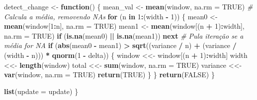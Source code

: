 \documentclass[
]{article}
\newenvironment{Shaded}{\begin{snugshade}}{\end{snugshade}}
\newcommand{\AttributeTok}[1]{\textcolor[rgb]{0.13,0.29,0.53}{#1}}
\newcommand{\CommentTok}[1]{\textcolor[rgb]{0.56,0.35,0.01}{\textit{#1}}}
\newcommand{\ConstantTok}[1]{\textcolor[rgb]{0.56,0.35,0.01}{#1}}
\newcommand{\ControlFlowTok}[1]{\textcolor[rgb]{0.13,0.29,0.53}{\textbf{#1}}}
\newcommand{\DecValTok}[1]{\textcolor[rgb]{0.00,0.00,0.81}{#1}}
\newcommand{\FunctionTok}[1]{\textcolor[rgb]{0.13,0.29,0.53}{\textbf{#1}}}
\newcommand{\NormalTok}[1]{#1}
\newcommand{\OtherTok}[1]{\textcolor[rgb]{0.56,0.35,0.01}{#1}}
\newcommand{\SpecialCharTok}[1]{\textcolor[rgb]{0.81,0.36,0.00}{\textbf{#1}}}
\begin{document}
\begin{Shaded}
\begin{Highlighting}[]
\NormalTok{  detect\_change }\OtherTok{\textless{}{-}} \ControlFlowTok{function}\NormalTok{() \{}
\NormalTok{    mean\_val }\OtherTok{\textless{}{-}} \FunctionTok{mean}\NormalTok{(window, }\AttributeTok{na.rm =} \ConstantTok{TRUE}\NormalTok{) }\CommentTok{\# Calcula a média, removendo NAs}
    \ControlFlowTok{for}\NormalTok{ (n }\ControlFlowTok{in} \DecValTok{1}\SpecialCharTok{:}\NormalTok{(width }\SpecialCharTok{{-}} \DecValTok{1}\NormalTok{)) \{}
\NormalTok{      mean0 }\OtherTok{\textless{}{-}} \FunctionTok{mean}\NormalTok{(window[}\DecValTok{1}\SpecialCharTok{:}\NormalTok{n], }\AttributeTok{na.rm =} \ConstantTok{TRUE}\NormalTok{)}
\NormalTok{      mean1 }\OtherTok{\textless{}{-}} \FunctionTok{mean}\NormalTok{(window[(n }\SpecialCharTok{+} \DecValTok{1}\NormalTok{)}\SpecialCharTok{:}\NormalTok{width], }\AttributeTok{na.rm =} \ConstantTok{TRUE}\NormalTok{)}
      \ControlFlowTok{if}\NormalTok{ (}\FunctionTok{is.na}\NormalTok{(mean0) }\SpecialCharTok{||} \FunctionTok{is.na}\NormalTok{(mean1)) }\ControlFlowTok{next} \CommentTok{\# Pula iteração se a média for NA}
      \ControlFlowTok{if}\NormalTok{ (}\FunctionTok{abs}\NormalTok{(mean0 }\SpecialCharTok{{-}}\NormalTok{ mean1) }\SpecialCharTok{\textgreater{}} \FunctionTok{sqrt}\NormalTok{((variance }\SpecialCharTok{/}\NormalTok{ n) }\SpecialCharTok{+}\NormalTok{ (variance }\SpecialCharTok{/}\NormalTok{ (width }\SpecialCharTok{{-}}\NormalTok{ n))) }\SpecialCharTok{*} \FunctionTok{qnorm}\NormalTok{(}\DecValTok{1} \SpecialCharTok{{-}}\NormalTok{ delta)) \{}
\NormalTok{        window }\OtherTok{\textless{}\textless{}{-}}\NormalTok{ window[(n }\SpecialCharTok{+} \DecValTok{1}\NormalTok{)}\SpecialCharTok{:}\NormalTok{width]}
\NormalTok{        width }\OtherTok{\textless{}\textless{}{-}} \FunctionTok{length}\NormalTok{(window)}
\NormalTok{        total }\OtherTok{\textless{}\textless{}{-}} \FunctionTok{sum}\NormalTok{(window, }\AttributeTok{na.rm =} \ConstantTok{TRUE}\NormalTok{)}
\NormalTok{        variance }\OtherTok{\textless{}\textless{}{-}} \FunctionTok{var}\NormalTok{(window, }\AttributeTok{na.rm =} \ConstantTok{TRUE}\NormalTok{)}
        \FunctionTok{return}\NormalTok{(}\ConstantTok{TRUE}\NormalTok{)}
\NormalTok{      \}}
\NormalTok{    \}}
    \FunctionTok{return}\NormalTok{(}\ConstantTok{FALSE}\NormalTok{)}
\NormalTok{  \}}
  
  \FunctionTok{list}\NormalTok{(}\AttributeTok{update =}\NormalTok{ update)}
\NormalTok{\}}


\end{Highlighting}
\end{Shaded}
\end{document}
